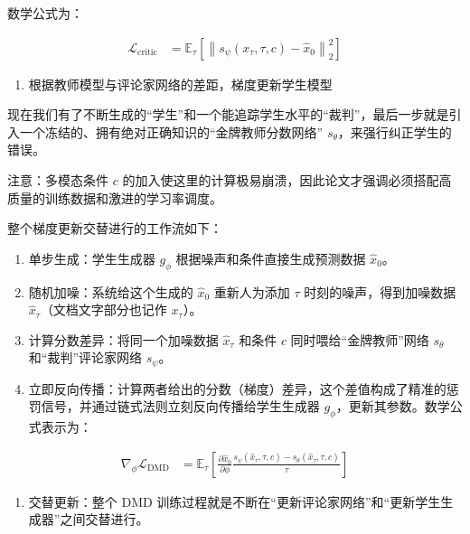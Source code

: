 数学公式为：

\[
\begin{aligned}
\mathcal{L}_{\mathrm{critic}}
&=\mathbb{E}_{\tau}\left[\left\|s_\psi(x_\tau,\tau,c)-\hat{x}_0\right\|_2^2\right]
\end{aligned}
\]

\begin{enumerate}
\def\labelenumi{\arabic{enumi}.}
\setcounter{enumi}{1}
\tightlist
\item
  根据教师模型与评论家网络的差距，梯度更新学生模型
\end{enumerate}

现在我们有了不断生成的``学生''和一个能追踪学生水平的``裁判''，最后一步就是引入一个冻结的、拥有绝对正确知识的``金牌教师分数网络'' \(s_\theta\)，来强行纠正学生的错误。

注意：多模态条件 \(c\) 的加入使这里的计算极易崩溃，因此论文才强调必须搭配高质量的训练数据和激进的学习率调度。

整个梯度更新交替进行的工作流如下：

\begin{enumerate}
\def\labelenumi{\arabic{enumi}.}
\tightlist
\item
  单步生成：学生生成器 \(g_\phi\) 根据噪声和条件直接生成预测数据 \(\hat{x}_0\)。
\item
  随机加噪：系统给这个生成的 \(\hat{x}_0\) 重新人为添加 \(\tau\) 时刻的噪声，得到加噪数据 \(\hat{x}_\tau\)（文档文字部分也记作 \(x_\tau\)）。
\item
  计算分数差异：将同一个加噪数据 \(\hat{x}_\tau\) 和条件 \(c\) 同时喂给``金牌教师''网络 \(s_\theta\) 和``裁判''评论家网络 \(s_\psi\)。
\item
  立即反向传播：计算两者给出的分数（梯度）差异，这个差值构成了精准的惩罚信号，并通过链式法则立刻反向传播给学生生成器 \(g_\phi\)，更新其参数。数学公式表示为：
\end{enumerate}

\[
\begin{aligned}
\nabla_\phi\mathcal{L}_{\mathrm{DMD}}
&=\mathbb{E}_{\tau}\left[
\frac{\partial\hat{x}_0}{\partial\phi}
\frac{s_\psi(\hat{x}_\tau,\tau,c)-s_\theta(\hat{x}_\tau,\tau,c)}{\tau}
\right]
\end{aligned}
\]

\begin{enumerate}
\def\labelenumi{\arabic{enumi}.}
\setcounter{enumi}{4}
\tightlist
\item
  交替更新：整个 DMD 训练过程就是不断在``更新评论家网络''和``更新学生生成器''之间交替进行。
\end{enumerate}

